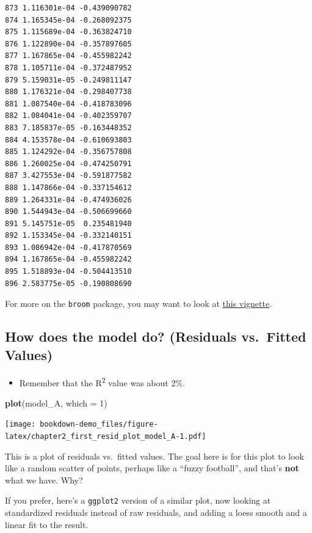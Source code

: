 \documentclass[]{book}
\newenvironment{Shaded}{\begin{snugshade}}{\end{snugshade}}
\newcommand{\KeywordTok}[1]{\textcolor[rgb]{0.13,0.29,0.53}{\textbf{#1}}}
\newcommand{\DataTypeTok}[1]{\textcolor[rgb]{0.13,0.29,0.53}{#1}}
\newcommand{\DecValTok}[1]{\textcolor[rgb]{0.00,0.00,0.81}{#1}}
\newcommand{\NormalTok}[1]{#1}
\providecommand{\tightlist}{%
  \setlength{\itemsep}{0pt}\setlength{\parskip}{0pt}}
\theoremstyle{definition}
\theoremstyle{definition}
\theoremstyle{definition}
\theoremstyle{remark}
\begin{document}
\begin{verbatim}
873 1.116301e-04 -0.439090782
874 1.165345e-04 -0.268092375
875 1.115689e-04 -0.363824710
876 1.122890e-04 -0.357897605
877 1.167865e-04 -0.455982242
878 1.105711e-04 -0.372487952
879 5.159031e-05 -0.249811147
880 1.176321e-04 -0.298407738
881 1.087540e-04 -0.418783096
882 1.084041e-04 -0.402359707
883 7.185837e-05 -0.163448352
884 4.153578e-04 -0.610693803
885 1.124292e-04 -0.356757808
886 1.260025e-04 -0.474250791
887 3.427553e-04 -0.591877582
888 1.147866e-04 -0.337154612
889 1.264331e-04 -0.474936026
890 1.544943e-04 -0.506699660
891 5.145751e-05  0.235481940
892 1.153345e-04 -0.332140151
893 1.086942e-04 -0.417870569
894 1.167865e-04 -0.455982242
895 1.518893e-04 -0.504413510
896 2.583775e-05 -0.190808690
\end{verbatim}

For more on the \texttt{broom} package, you may want to look at
\href{https://cran.r-project.org/web/packages/broom/vignettes/broom.html}{this
vignette}.

\subsection{How does the model do? (Residuals vs.~Fitted
Values)}\label{how-does-the-model-do-residuals-vs.fitted-values}

\begin{itemize}
\tightlist
\item
  Remember that the R\textsuperscript{2} value was about 2\%.
\end{itemize}

\begin{Shaded}
\begin{Highlighting}[]
\KeywordTok{plot}\NormalTok{(model_A, }\DataTypeTok{which =} \DecValTok{1}\NormalTok{)}
\end{Highlighting}
\end{Shaded}

\texttt{[image: bookdown-demo\_files/figure-latex/chapter2\_first\_resid\_plot\_model\_A-1.pdf]}

This is a plot of residuals vs.~fitted values. The goal here is for this
plot to look like a random scatter of points, perhaps like a ``fuzzy
football'', and that's \textbf{not} what we have. Why?

If you prefer, here's a \texttt{ggplot2} version of a similar plot, now
looking at standardized residuals instead of raw residuals, and adding a
loess smooth and a linear fit to the result.
\end{document}

